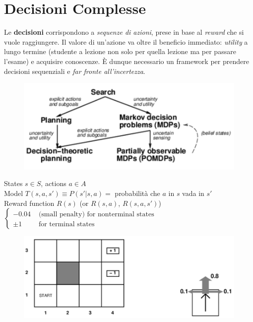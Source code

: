 \documentclass[a4paper, notitlepage, 9pt]{extreport}
\begin{document}
\chapter*{Decisioni Complesse}
\begin{multicols}{2}
	\noindent
	Le \textbf{decisioni} corrispondono a \textit{sequenze di azioni}, prese in base al \textit{reward} che si vuole raggiungere. Il valore di un'azione va oltre il beneficio immediato: \textit{utility} a lungo termine (studente a lezione non solo per quella lezione ma per passare l'esame) e acquisire conoscenze. È dunque necessario un framework per prendere decisioni sequenziali e \textit{far fronte all'incertezza}.
	\columnbreak
	\begin{figure}[H]
		\centering
		\includegraphics[scale=0.43]{Decision}
	\end{figure}
\end{multicols}
\begin{multicols}{2}
	\noindent
	States $s \in S$, actions $a \in A$\\
	Model $T(s,a,s') \equiv P(s'|s,a) =$ probabilità che $a$ in $s$ vada in $s'$\\
	Reward function $R(s)$ (or $R(s, a)$, $R(s, a, s')$)
	$\begin{cases}
		-0.04 &\text{ (small penalty)  for nonterminal states } \\
		\pm1 & \text{ for terminal states }
	\end{cases}$
	\columnbreak
	\begin{figure}[H]
		\centering
		\includegraphics[scale=0.25]{Maze}
	\end{figure}
\end{multicols}
\end{document}
